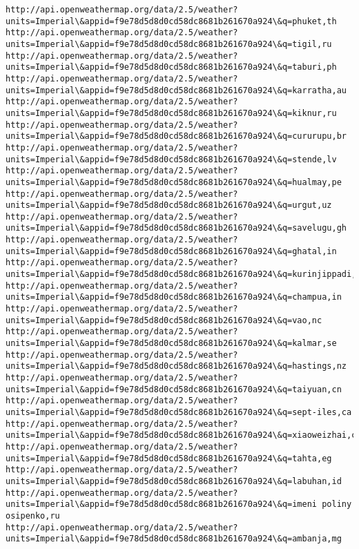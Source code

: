 \documentclass[11pt]{article}
\begin{document}
\begin{Verbatim}[commandchars=\\\{\}]
http://api.openweathermap.org/data/2.5/weather?units=Imperial\&appid=f9e78d5d8d0cd58dc8681b261670a924\&q=phuket,th
http://api.openweathermap.org/data/2.5/weather?units=Imperial\&appid=f9e78d5d8d0cd58dc8681b261670a924\&q=tigil,ru
http://api.openweathermap.org/data/2.5/weather?units=Imperial\&appid=f9e78d5d8d0cd58dc8681b261670a924\&q=taburi,ph
http://api.openweathermap.org/data/2.5/weather?units=Imperial\&appid=f9e78d5d8d0cd58dc8681b261670a924\&q=karratha,au
http://api.openweathermap.org/data/2.5/weather?units=Imperial\&appid=f9e78d5d8d0cd58dc8681b261670a924\&q=kiknur,ru
http://api.openweathermap.org/data/2.5/weather?units=Imperial\&appid=f9e78d5d8d0cd58dc8681b261670a924\&q=cururupu,br
http://api.openweathermap.org/data/2.5/weather?units=Imperial\&appid=f9e78d5d8d0cd58dc8681b261670a924\&q=stende,lv
http://api.openweathermap.org/data/2.5/weather?units=Imperial\&appid=f9e78d5d8d0cd58dc8681b261670a924\&q=hualmay,pe
http://api.openweathermap.org/data/2.5/weather?units=Imperial\&appid=f9e78d5d8d0cd58dc8681b261670a924\&q=urgut,uz
http://api.openweathermap.org/data/2.5/weather?units=Imperial\&appid=f9e78d5d8d0cd58dc8681b261670a924\&q=savelugu,gh
http://api.openweathermap.org/data/2.5/weather?units=Imperial\&appid=f9e78d5d8d0cd58dc8681b261670a924\&q=ghatal,in
http://api.openweathermap.org/data/2.5/weather?units=Imperial\&appid=f9e78d5d8d0cd58dc8681b261670a924\&q=kurinjippadi,in
http://api.openweathermap.org/data/2.5/weather?units=Imperial\&appid=f9e78d5d8d0cd58dc8681b261670a924\&q=champua,in
http://api.openweathermap.org/data/2.5/weather?units=Imperial\&appid=f9e78d5d8d0cd58dc8681b261670a924\&q=vao,nc
http://api.openweathermap.org/data/2.5/weather?units=Imperial\&appid=f9e78d5d8d0cd58dc8681b261670a924\&q=kalmar,se
http://api.openweathermap.org/data/2.5/weather?units=Imperial\&appid=f9e78d5d8d0cd58dc8681b261670a924\&q=hastings,nz
http://api.openweathermap.org/data/2.5/weather?units=Imperial\&appid=f9e78d5d8d0cd58dc8681b261670a924\&q=taiyuan,cn
http://api.openweathermap.org/data/2.5/weather?units=Imperial\&appid=f9e78d5d8d0cd58dc8681b261670a924\&q=sept-iles,ca
http://api.openweathermap.org/data/2.5/weather?units=Imperial\&appid=f9e78d5d8d0cd58dc8681b261670a924\&q=xiaoweizhai,cn
http://api.openweathermap.org/data/2.5/weather?units=Imperial\&appid=f9e78d5d8d0cd58dc8681b261670a924\&q=tahta,eg
http://api.openweathermap.org/data/2.5/weather?units=Imperial\&appid=f9e78d5d8d0cd58dc8681b261670a924\&q=labuhan,id
http://api.openweathermap.org/data/2.5/weather?units=Imperial\&appid=f9e78d5d8d0cd58dc8681b261670a924\&q=imeni poliny osipenko,ru
http://api.openweathermap.org/data/2.5/weather?units=Imperial\&appid=f9e78d5d8d0cd58dc8681b261670a924\&q=ambanja,mg

\end{Verbatim}
\end{document}
